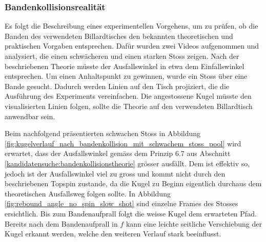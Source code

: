 \subsubsection{Bandenkollisionsrealität}
Es folgt die Beschreibung eines experimentellen Vorgehens, um zu prüfen, ob die Banden des verwendeten Billardtisches den
bekannten theoretischen und praktischen Vorgaben entsprechen. Dafür wurden zwei Videos aufgenommen und analysiert,
die einen schwächeren und einen starken Stoss zeigen.
Nach der beschriebenen Theorie müsste der Ausfallswinkel in etwa dem Einfallswinkel entsprechen.
Um einen Anhaltspunkt zu gewinnen, wurde ein Stoss
über eine Bande gesucht. Dadurch werden Linien auf den Tisch projiziert, die die Ausführung des Experiments vereinfachen.
Die angestossene Kugel müsste den visualisierten Linien folgen, sollte die Theorie auf den verwendeten Billardtisch
anwendbar sein.

Beim nachfolgend präsentierten schwachen Stoss in Abbildung \ref{fig:kugelverlauf_nach_bandenkollision_mit_schwachem_stoss_pool} wird erwartet, dass der Ausfallswinkel gemäss dem Prinzip 6.7 aus
Abschnitt \ref{kandidatensuche:bandenkollisionstheorie} grösser ausfällt. Dem ist effektiv so, jedoch ist
der Ausfallswinkel viel zu gross und kommt nicht durch den beschriebenen Topspin zustande, da die Kugel zu Beginn
eigentlich durchaus dem theoretischen Ausfallsweg folgen sollte. In Abbildung \ref{fig:rebound_angle_no_spin_slow_shot} sind
einzelne Frames des Stosses ersichtlich. Bis zum Bandenaufprall folgt die weisse Kugel dem erwarteten Pfad. Bereits nach
dem Bandenaufprall in $f$ kann eine leichte seitliche Verschiebung der Kugel erkannt werden, welche den weiteren Verlauf
stark beeinflusst.

